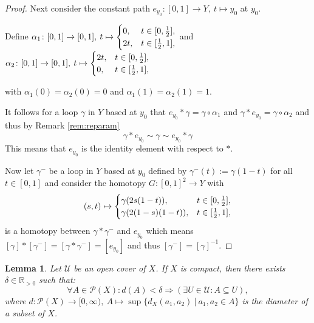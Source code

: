\documentclass[a4paper, 11pt, twoside]{article}
\newcommand{\R}[0]{\mathbb{R}}
\theoremstyle{break}
\theoremstyle{break}
\newtheorem{lemma}[thm]{Lemma}
\begin{document}
\begin{proof}
  Next consider the constant path $e_{y_0}\colon [0,1] \to Y, \: t \mapsto y_0$ at $y_0$. 
  
  \vspace*{5pt}
  Define $\alpha_1\colon [0,1] \to [0,1], \: t \mapsto \begin{cases}
    0, &t\in[0, {1\over2}],\\
    2t, &t\in[{1\over2}, 1],
  \end{cases}$ and $\alpha_2\colon [0,1]\to [0,1], \: t \mapsto \begin{cases}
    2t, &t\in[0, {1\over2}],\\
    0, &t\in[{1\over2}, 1],
  \end{cases}$

  with $\alpha_1(0) = \alpha_2(0) = 0$ and $\alpha_1(1) = \alpha_2(1) = 1$.

  It follows for a loop $\gamma$ in $Y$ based at $y_0$ that $e_{y_0} * \gamma = \gamma \circ \alpha_1$ and $\gamma * e_{y_0} = \gamma \circ \alpha_2$ and thus by Remark \ref{rem:reparam}
  \begin{equation*}
    \gamma * e_{y_0} \sim \gamma \sim e_{y_0} * \gamma
  \end{equation*}
  This means that $e_{y_0}$ is the identity element with respect to $*$.

  Now let $\gamma^-$ be a loop in $Y$ based at $y_0$ defined by $\gamma^-(t) := \gamma(1 - t)$ for all $t \in [0,1]$ and consider the homotopy $G\colon [0,1]^2 \to Y$ with 
  \begin{equation*}
    (s, t) \mapsto \begin{cases}
      \gamma(2s(1-t)), &t \in [0, {1\over2}], \\
      \gamma(2(1-s)(1-t)), &t \in [{1\over2}, 1],
    \end{cases}
  \end{equation*}
  is a homotopy between $\gamma * \gamma^-$ and $e_{y_0}$ which means $[\gamma] * [\gamma^-] = [\gamma * \gamma^-] = [e_{y_0}]$ and thus $[\gamma^-] = [\gamma]^{-1}$. 
\end{proof}

\begin{lemma}\label{lem:lesbesgue}
  Let $\mathcal{U}$ be an open cover of $X$. If $X$ is compact, then there exists $\delta \in \R_{>0}$ such that:
  \begin{equation*}
    \forall A \in \mathcal{P}(X)\colon d(A) < \delta \Rightarrow (\exists U \in \mathcal{U}\colon A \subseteq U),
  \end{equation*}
  where $d\colon \mathcal{P}(X) \to [0, \infty), \: A \mapsto \sup \{ d_X(a_1, a_2) \: | \: a_1,a_2\in A \}$ is the diameter of a subset of $X$.
\end{lemma}
\end{document}

